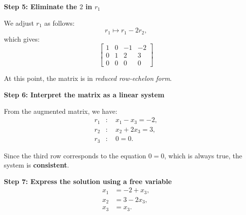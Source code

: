 \begin{solution}
    \textbf{Step 5: Eliminate the \( 2 \) in \( r_1 \)}
        
        We adjust \( r_1 \) as follows:
        \[
        r_1 \mapsto r_1 - 2r_2,
        \]
        which gives:
        \[
        \left[\begin{array}{ccc|c}
        1 & 0 & -1 & -2 \\
        0 & 1 & 2 & 3 \\
        0 & 0 & 0 & 0
        \end{array}\right]
        \]
        
    At this point, the matrix is in \textit{reduced row-echelon form}.
        
    \textbf{Step 6: Interpret the matrix as a linear system}
        
        From the augmented matrix, we have:
        \[
        \begin{aligned}
        r_1 &: \quad x_1 - x_3 = -2, \\
        r_2 &: \quad x_2 + 2x_3 = 3, \\
        r_3 &: \quad 0 = 0.
        \end{aligned}
        \]
        
    Since the third row corresponds to the equation \( 0 = 0 \), which is always true, the system is \textbf{consistent}.
        
    \textbf{Step 7: Express the solution using a free variable}
        \[
        \begin{aligned}
        x_1 &= -2 + x_3, \\
        x_2 &= 3 - 2x_3, \\
        x_3 &= x_3.
        \end{aligned}
        \]      
\end{solution}
